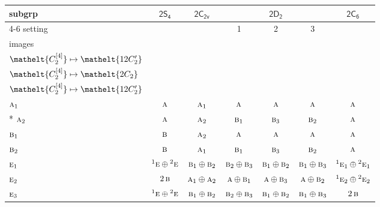 \documentclass[10pt,a4paper]{article}
\numberwithin{equation}{section}
\newcommand{\eltfont}[1]{{\let\sigma\eltsigma\mathelt{#1}}}
\newcommand{\grp}[1]{\mathsf{#1}}
\newcommand{\irr}[1]{\text{\normalfont\scshape #1}}
\newcommand{\conjpair}[1]{{}^{#1}}
\newcommand{\cls}[1]{\eltfont{#1}}
\newcommand{\genidx}[2]{#1^{[\mathrm{#2}]}}
\begin{document}
{\small\begin{longtable}{@{}lcccccc@{}}\toprule
subgrp & \href{2S4.pdf}{$\grp{2S_{4}}$} & \href{2C2v.pdf}{$\grp{2C_{2v}}$} & \multicolumn{3}{c}{\href{2D2.pdf}{$\grp{2D_{2}}$}} & \href{2C6.pdf}{$\grp{2C_{6}}$}\\\cmidrule(lr){4-6}
setting &  &  & 1 & 2 & 3 & \\
images &  &  & {\scriptsize\begin{tabular}[t]{@{}c@{}}$\cls{\genidx{C_{2}}{2}} \mapsto \cls{2C_{2}}$\\$\cls{\genidx{C_{2}}{4}} \mapsto \cls{12C_{2}'}$\end{tabular}} & {\scriptsize\begin{tabular}[t]{@{}c@{}}$\cls{\genidx{C_{2}}{2}} \mapsto \cls{12C_{2}'}$\\$\cls{\genidx{C_{2}}{4}} \mapsto \cls{2C_{2}}$\end{tabular}} & {\scriptsize\begin{tabular}[t]{@{}c@{}}$\cls{\genidx{C_{2}}{2}} \mapsto \cls{12C_{2}'}$\\$\cls{\genidx{C_{2}}{4}} \mapsto \cls{12C_{2}'}$\end{tabular}} & \\\midrule\endhead
\bottomrule\endfoot\endlastfoot
$\irr{a}_{1}$ & $\irr{a}$ & $\irr{a}_{1}$ & $\irr{a}$ & $\irr{a}$ & $\irr{a}$ & $\irr{a}$\\*
$\irr{a}_{2}$ & $\irr{a}$ & $\irr{a}_{2}$ & $\irr{b}_{1}$ & $\irr{b}_{3}$ & $\irr{b}_{2}$ & $\irr{a}$\\
$\irr{b}_{1}$ & $\irr{b}$ & $\irr{a}_{2}$ & $\irr{a}$ & $\irr{a}$ & $\irr{a}$ & $\irr{a}$\\
$\irr{b}_{2}$ & $\irr{b}$ & $\irr{a}_{1}$ & $\irr{b}_{1}$ & $\irr{b}_{3}$ & $\irr{b}_{2}$ & $\irr{a}$\\
$\irr{e}_{1}$ & $\conjpair{1}\irr{e}\oplus \conjpair{2}\irr{e}$ & $\irr{b}_{1}\oplus \irr{b}_{2}$ & $\irr{b}_{2}\oplus \irr{b}_{3}$ & $\irr{b}_{1}\oplus \irr{b}_{2}$ & $\irr{b}_{1}\oplus \irr{b}_{3}$ & $\conjpair{1}\irr{e}_{1}\oplus \conjpair{2}\irr{e}_{1}$\\
$\irr{e}_{2}$ & $2\,\irr{b}$ & $\irr{a}_{1}\oplus \irr{a}_{2}$ & $\irr{a}\oplus \irr{b}_{1}$ & $\irr{a}\oplus \irr{b}_{3}$ & $\irr{a}\oplus \irr{b}_{2}$ & $\conjpair{1}\irr{e}_{2}\oplus \conjpair{2}\irr{e}_{2}$\\
$\irr{e}_{3}$ & $\conjpair{1}\irr{e}\oplus \conjpair{2}\irr{e}$ & $\irr{b}_{1}\oplus \irr{b}_{2}$ & $\irr{b}_{2}\oplus \irr{b}_{3}$ & $\irr{b}_{1}\oplus \irr{b}_{2}$ & $\irr{b}_{1}\oplus \irr{b}_{3}$ & $2\,\irr{b}$\\

\end{longtable}}
\end{document}
